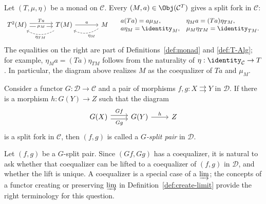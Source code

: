 \begin{example}\label{eg:T-split-fork}
	Let $(T,\mu,\eta)$ be a monad on $\mathcal{C}$. Every
	$(M,a)\in\Obj(\mathcal{C}^T)$ gives a split fork in $\mathcal{C}$:
	\begin{equation*}\begin{tikzcd}[column sep=large]
			T^2(M) \arrow[shift left, r, "Ta"] \arrow[shift right, r, "\mu_M" description] & T(M) \arrow[r, "a"] \arrow[dashed, bend left, l, "\eta_{TM}"] & M \arrow[dashed, bend left, l, "\eta_M"]
		\end{tikzcd} \quad \begin{array}{ll}
			a (Ta) = a \mu_M , & \eta_M a = (Ta) \eta_{TM}, \\
			a \eta_M = \identity_M , & \mu_M \eta_{TM} = \identity_{TM}.
		\end{array}\end{equation*}
	The equalities on the right are part of Definitions~\ref{def:monad} and
	\ref{def:T-Alg}; for example,
	$\eta_Ma=(Ta)\eta_{TM}$ follows from the naturality of
	$\eta:\identity_{\mathcal{C}}\to T$. In particular, the diagram above
	realizes $M$ as the coequalizer of $Ta$ and $\mu_M$.
\end{example}

\begin{definition}\label{def:Beck-split-pair}
	Consider a functor $G:\mathcal{D}\to\mathcal{C}$ and a pair of morphisms
	$f,g:X\rightrightarrows Y$ in $\mathcal{D}$. If there is a morphism
	$h:G(Y)\to Z$ such that the diagram
	\begin{equation*}\begin{tikzcd}
			G(X) \arrow[shift left, r, "Gf"] \arrow[shift right, r, "Gg"'] & G(Y) \arrow[r, "h"] & Z
	\end{tikzcd}\end{equation*}
	is a split fork in $\mathcal{C}$, then $(f,g)$ is called a
	\emph{$G$-split pair} in $\mathcal{D}$.
\end{definition}

Let $(f,g)$ be a $G$-split pair. Since $(Gf,Gg)$ has a coequalizer, it is
natural to ask whether that coequalizer can be lifted to a coequalizer of
$(f,g)$ in $\mathcal{D}$, and whether the lift is unique. A coequalizer is a
special case of a $\varinjlim$; the concepts of a functor creating or
preserving $\varinjlim$ in Definition~\ref{def:create-limit} provide the
right terminology for this question.

